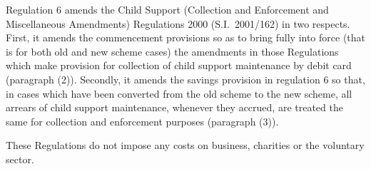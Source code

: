 \documentclass[12pt,a4paper]{article}
\begin{document}
Regulation 6 amends the Child Support (Collection and Enforcement and Miscellaneous Amendments) Regulations 2000 (S.I.\ 2001/162) in two respects. First, it amends the commencement provisions so as to bring fully into force (that is for both old and new scheme cases) the amendments in those Regulations which make provision for collection of child support maintenance by debit card (paragraph (2)). Secondly, it amends the savings provision in regulation 6 so that, in cases which have been converted from the old scheme to the new scheme, all arrears of child support maintenance, whenever they accrued, are treated the same for collection and enforcement purposes (paragraph (3)).

These Regulations do not impose any costs on business, charities or the voluntary sector. 
\end{document}
